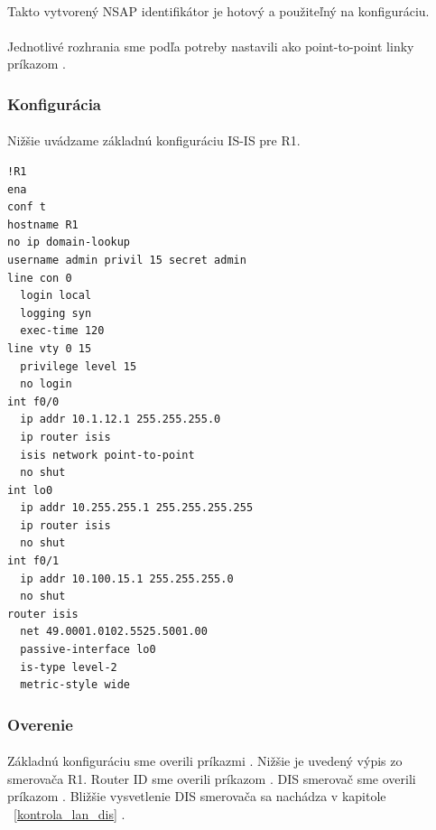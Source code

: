 \documentclass[12pt,twoside,a4paper]{report}
\begin{document}
\paragraph{}
Takto vytvorený NSAP identifikátor je hotový a použiteľný na konfiguráciu.

\paragraph{}
Jednotlivé rozhrania sme podľa potreby nastavili ako point-to-point linky príkazom .


\subsubsection{Konfigurácia}
\paragraph{}
Nižšie uvádzame základnú konfiguráciu IS-IS pre R1.

\noindent
{\selectfont
\begin{small}
\begin{verbatim}
!R1
ena
conf t
hostname R1
no ip domain-lookup
username admin privil 15 secret admin
line con 0
  login local
  logging syn
  exec-time 120
line vty 0 15
  privilege level 15
  no login
int f0/0
  ip addr 10.1.12.1 255.255.255.0
  ip router isis
  isis network point-to-point
  no shut
int lo0
  ip addr 10.255.255.1 255.255.255.255
  ip router isis
  no shut
int f0/1
  ip addr 10.100.15.1 255.255.255.0
  no shut
router isis
  net 49.0001.0102.5525.5001.00
  passive-interface lo0
  is-type level-2
  metric-style wide
\end{verbatim}
\end{small}
}

\subsubsection{Overenie}
\paragraph{}
Základnú konfiguráciu sme overili príkazmi . Nižšie je uvedený výpis zo smerovača R1. Router ID sme overili príkazom . DIS smerovač sme overili príkazom . Bližšie vysvetlenie DIS smerovača sa nachádza v kapitole ~\ref{kontrola_lan_dis} .
\end{document}

